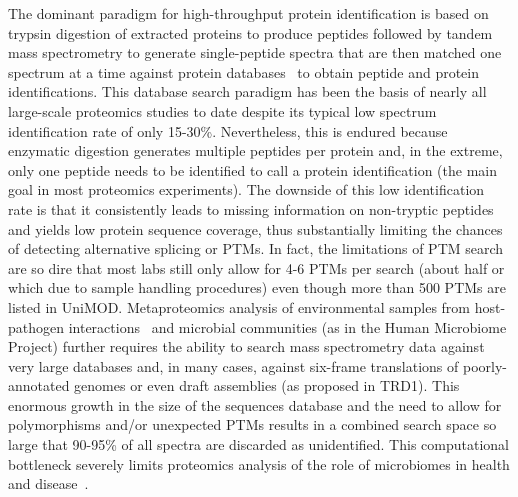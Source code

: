 \documentclass[arial,11pt]{article}
\begin{document}
The dominant paradigm for high-throughput protein identification is based on trypsin digestion of extracted proteins to produce peptides followed by tandem mass spectrometry to generate single-peptide spectra that are then matched one spectrum at a time against protein databases~\cite{eng94,perkins99,craig04,tanner05} to obtain peptide and protein identifications. This database search paradigm has been the basis of nearly all large-scale proteomics studies to date despite its typical low spectrum identification rate of only 15-30\%. Nevertheless, this is endured because enzymatic digestion generates multiple peptides per protein and, in the extreme, only one peptide needs to be identified to call a protein identification (the main goal in most proteomics experiments). The downside of this low identification rate is that it consistently leads to missing information on non-tryptic peptides
and yields low protein sequence coverage, thus substantially limiting the chances of detecting alternative splicing or
PTMs. In fact, the limitations of PTM search are so dire that most labs still only allow for 4-6 PTMs per search (about half or which due to sample handling procedures) even though more than 500 PTMs are listed in UniMOD. Metaproteomics analysis of environmental samples from host-pathogen interactions~\cite{zheng11} and microbial communities (as in the Human Microbiome Project) further requires the ability to search mass spectrometry data against very large databases and, in many cases, against six-frame translations of poorly-annotated genomes or even draft assemblies (as proposed in TRD1). This enormous growth in the size of the sequences database and the need to allow for polymorphisms and/or unexpected PTMs results in a combined search space so large that 90-95\% of all spectra are  discarded as unidentified. This computational bottleneck severely limits proteomics analysis of the role of microbiomes in health and disease~\cite{pflughoeft11}.
\end{document}
